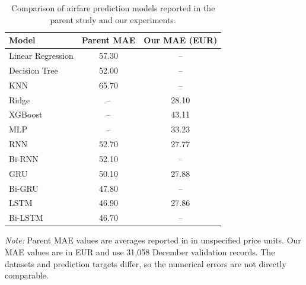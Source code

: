 \begin{table}[t]
\centering
\caption{Comparison of airfare prediction models reported in the parent study and our experiments.}
\label{tab:parent_comparison}
\small
\begin{tabular}{lcc}
\toprule
Model & Parent MAE & Our MAE (EUR) \\
\midrule
Linear Regression & 57.30 & -- \\
Decision Tree & 52.00 & -- \\
KNN & 65.70 & -- \\
Ridge & -- & 28.10 \\
XGBoost & -- & 43.11 \\
MLP & -- & 33.23 \\
RNN & 52.70 & 27.77 \\
Bi-RNN & 52.10 & -- \\
GRU & 50.10 & 27.88 \\
Bi-GRU & 47.80 & -- \\
LSTM & 46.90 & 27.86 \\
Bi-LSTM & 46.70 & -- \\
\bottomrule
\end{tabular}
\vspace{1mm}
\begin{minipage}{\columnwidth}
\footnotesize
\textit{Note:} Parent MAE values are averages reported in \cite{meepaganithage_airfare} in unspecified price units. Our MAE values are in EUR and use 31,058 December validation records. The datasets and prediction targets differ, so the numerical errors are not directly comparable.
\end{minipage}
\end{table}